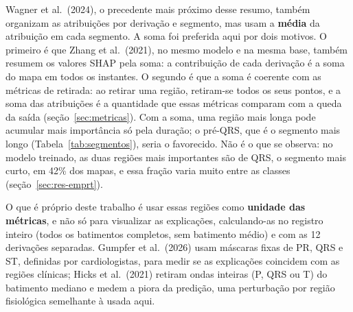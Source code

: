 \documentclass[11pt,a4paper]{article}
\begin{document}
Wagner et al.\ (2024), o precedente mais próximo desse resumo, também organizam as atribuições por derivação e segmento, mas usam a \textbf{média} da atribuição em cada segmento. A soma foi preferida aqui por dois motivos. O primeiro é que Zhang et al.\ (2021), no mesmo modelo e na mesma base, também resumem os valores SHAP pela soma: a contribuição de cada derivação é a soma do mapa em todos os instantes. O segundo é que a soma é coerente com as métricas de retirada: ao retirar uma região, retiram-se todos os seus pontos, e a soma das atribuições é a quantidade que essas métricas comparam com a queda da saída (seção~\ref{sec:metricas}). Com a soma, uma região mais longa pode acumular mais importância só pela duração; o pré-QRS, que é o segmento mais longo (Tabela~\ref{tab:segmentos}), seria o favorecido. Não é o que se observa: no modelo treinado, as duas regiões mais importantes são de QRS, o segmento mais curto, em 42\% dos mapas, e essa fração varia muito entre as classes (seção~\ref{sec:res-emprt}).

O que é próprio deste trabalho é usar essas regiões como \textbf{unidade das métricas}, e não só para visualizar as explicações, calculando-as no registro inteiro (todos os batimentos completos, sem batimento médio) e com as 12 derivações separadas. Gumpfer et al.\ (2026) usam máscaras fixas de PR, QRS e ST, definidas por cardiologistas, para medir se as explicações coincidem com as regiões clínicas; Hicks et al.\ (2021) retiram ondas inteiras (P, QRS ou T) do batimento mediano e medem a piora da predição, uma perturbação por região fisiológica semelhante à usada aqui.
\end{document}
